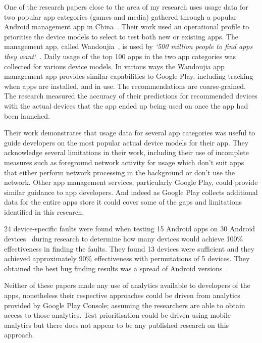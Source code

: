 One of the research papers close to the area of my research uses usage data for two popular app categories (games and media) gathered through a popular Android management app in China~. Their work used an operational profile to prioritise the device models to select to test both new or existing apps. The management app, called Wandoujia~, is used by \emph{`500 million people to find apps they want`}~. Daily usage of the top 100 apps in the two app categories was collected for various device models. In various ways the Wandoujia app management app provides similar capabilities to Google Play, including tracking when apps are installed, and in use. The recommendations are coarse-grained. The research measured the accuracy of their predictions for recommended devices with the actual devices that the app ended up being used on once the app had been launched. 

Their work demonstrates that usage data for several app categories was useful to guide developers on the most popular actual device models for their app. They acknowledge several limitations in their work, including their use of incomplete measures such as foreground network activity for usage which don't suit apps that either perform network processing in the background or don't use the network. Other app management services, particularly Google Play, could provide similar guidance to app developers. And indeed as Google Play collects additional data for the entire apps store it could cover some of the gaps and limitations identified in this research.

24 device-specific faults were found when testing 15 Android apps on 30 Android devices~ during research to determine how many devices would achieve 100\% effectiveness in finding the faults. They found 13 devices were sufficient and they achieved approximately 90\% effectiveness with permutations of 5 devices. They obtained the best bug finding results was a spread of Android versions~. 

Neither of these papers made any use of analytics available to developers of the apps, nonetheless their respective approaches could be driven from analytics provided by Google Play Console; assuming the researchers are able to obtain access to those analytics. Test prioritisation could be driven using mobile analytics but there does not appear to be any published research on this approach.

